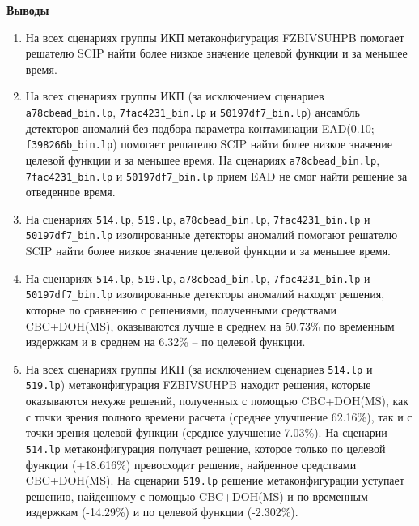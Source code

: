 \documentclass[%
	11pt,
	a4paper,
	utf8,
		]{article}
\begin{document}
\textbf{Выводы}
\begin{enumerate}
	\item На всех сценариях группы ИКП метаконфигурация FZBIVSUHPB помогает решателю SCIP найти более низкое значение целевой функции и за меньшее время.
	
	\item На всех сценариях группы ИКП (за исключением сценариев \texttt{a78cbead\_bin.lp}, \texttt{7fac4231\_bin.lp} и \texttt{50197df7\_bin.lp}) ансамбль детекторов аномалий без подбора параметра контаминации EAD(0.10; \texttt{f398266b\_bin.lp})  помогает решателю SCIP найти более низкое значение целевой функции и за меньшее время. На сценариях \texttt{a78cbead\_bin.lp}, \texttt{7fac4231\_bin.lp} и \texttt{50197df7\_bin.lp} прием EAD не смог найти решение за отведенное время.
	
	\item На сценариях \texttt{514.lp}, \texttt{519.lp}, \texttt{a78cbead\_bin.lp}, \texttt{7fac4231\_bin.lp} и \texttt{50197df7\_bin.lp} изолированные детекторы аномалий помогают решателю SCIP найти более низкое значение целевой функции и за меньшее время.
	
	\item На сценариях \texttt{514.lp}, \texttt{519.lp}, \texttt{a78cbead\_bin.lp}, \texttt{7fac4231\_bin.lp} и \texttt{50197df7\_bin.lp} изолированные детекторы аномалий находят решения, которые по сравнению с решениями, полученными средствами CBC+DOH(MS), оказываются лучше в среднем на 50.73\% по временным издержкам и в среднем на 6.32\% – по целевой функции.
	
	\item На всех сценариях группы ИКП (за исключением сценариев \texttt{514.lp} и \texttt{519.lp}) метаконфигурация FZBIVSUHPB находит решения, которые оказываются нехуже решений, полученных с помощью CBC+DOH(MS), как с точки зрения полного времени расчета (среднее улучшение 62.16\%), так и с точки зрения целевой функции (среднее улучшение 7.03\%). На сценарии \texttt{514.lp} метаконфигурация получает решение, которое только по целевой функции (+18.616\%) превосходит решение, найденное средствами CBC+DOH(MS). На сценарии \texttt{519.lp} решение метаконфигурации уступает решению, найденному с помощью CBC+DOH(MS) и по временным издержкам (-14.29\%) и по целевой функции (-2.302\%).
\end{enumerate}
\end{document}
